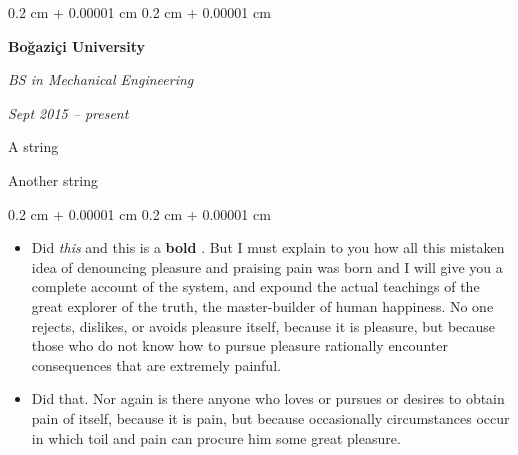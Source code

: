 \documentclass[10pt, letterpaper]{article}
\newenvironment{summary}{
    \begin{description}[
        topsep=0.10 cm,
        parsep=0.10 cm,
        partopsep=0pt,
        itemsep=0pt,
        leftmargin=0.4 cm + 10pt
    ]
}{
    \end{description}
} %
\newenvironment{highlights}{
    \begin{itemize}[
        topsep=0.10 cm,
        parsep=0.10 cm,
        partopsep=0pt,
        itemsep=0pt,
        leftmargin=0.4 cm + 10pt
    ]
}{
    \end{itemize}
} %
\newenvironment{onecolentry}{
    \begin{adjustwidth}{
        0.2 cm + 0.00001 cm
    }{
        0.2 cm + 0.00001 cm
    }
}{
    \end{adjustwidth}
} %
\newenvironment{twocolentry}[2][]{
    \onecolentry
    \def\secondColumn{#2}
    \setcolumnwidth{\fill, 4.5 cm}
    \begin{paracol}{2}
}{
    \switchcolumn \raggedleft \secondColumn
    \end{paracol}
    \endonecolentry
} %
\let\hrefWithoutArrow\href
\renewcommand{\href}[2]{\hrefWithoutArrow{#1}{\ifthenelse{\equal{#2}{}}{ }{#2 }\raisebox{.15ex}{\footnotesize \faExternalLink*}}}
\begin{document}
        \begin{twocolentry}{
            
            
        \textit{Sept 2015 – present}}
            \textbf{Boğaziçi University}

            \textit{BS in Mechanical Engineering}
        \end{twocolentry}
            \begin{summary}
                \item A string
                \item Another string
            \end{summary}
        \vspace{0.10 cm}
        \begin{onecolentry}
            \begin{highlights}
                \item Did \textit{this} and this is a \textbf{bold} \href{https://example.com}{link}. But I must explain to you how all this mistaken idea of denouncing pleasure and praising pain was born and I will give you a complete account of the system, and expound the actual teachings of the great explorer of the truth, the master-builder of human happiness. No one rejects, dislikes, or avoids pleasure itself, because it is pleasure, but because those who do not know how to pursue pleasure rationally encounter consequences that are extremely painful.
                \item Did that. Nor again is there anyone who loves or pursues or desires to obtain pain of itself, because it is pain, but because occasionally circumstances occur in which toil and pain can procure him some great pleasure.
            \end{highlights}
        \end{onecolentry}


        \vspace{0.2 cm}
\end{document}
